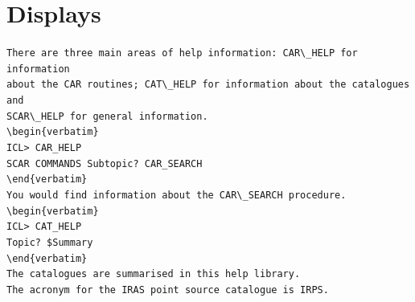 \documentclass[twoside,11pt]{article}
\newcommand{\xlabel}[1]{}
\begin{document}
\newpage

\section{Displays\xlabel{displays}}

\small

\verb+There are three main areas of help information: CAR\_HELP for information+\\
\verb+about the CAR routines; CAT\_HELP for information about the catalogues and +\\
\verb+SCAR\_HELP for general information.+\\
\verb+\begin{verbatim}+\\
\hspace*{10mm}\verb+ICL> CAR_HELP+\\
\hspace*{10mm}\verb+SCAR COMMANDS Subtopic? CAR_SEARCH+\\
\verb+\end{verbatim}+\\
\verb+You would find information about the CAR\_SEARCH procedure.+\\
\verb+\begin{verbatim}+\\
\hspace*{10mm}\verb+ICL> CAT_HELP+\\
\hspace*{10mm}\verb+Topic? $Summary+\\
\verb+\end{verbatim}+\\
\verb+The catalogues are summarised in this help library.+\\
\verb+The acronym for the IRAS point source catalogue is IRPS.+\\
\end{document}
